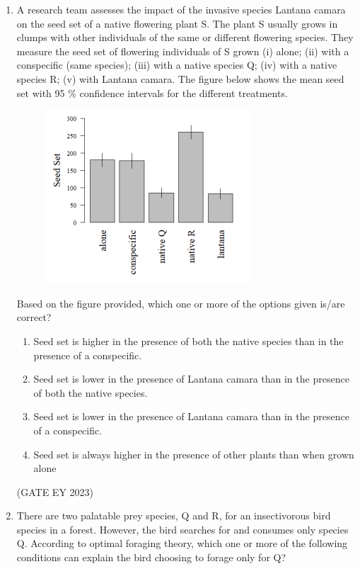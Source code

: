 \documentclass[journal,12pt,onecolumn]{IEEEtran}
\theoremstyle{remark}
\begin{document}
\begin{enumerate}
 \item A research team assesses the impact of the invasive species Lantana camara on the
seed set of a native flowering plant S. The plant S usually grows in clumps with
other individuals of the same or different flowering species. They measure the seed
set of flowering individuals of S grown (i) alone; (ii) with a conspecific (same
species); (iii) with a native species Q; (iv) with a native species R; (v) with
Lantana camara. The figure below shows the mean seed set with 95 \% confidence
intervals for the different treatments. 
\begin{figure}[H]
    \centering
    \includegraphics[]{figs/Q.50.png}
    \caption{}
    \label{fig:9}
\end{figure}

Based on the figure provided, which one or more of the options given is/are
correct?

\begin{enumerate}

\item Seed set is higher in the presence of both the native species than in the presence of
a conspecific.

\item Seed set is lower in the presence of Lantana camara than in the presence of both
the native species.
\item Seed set is lower in the presence of Lantana camara than in the presence of a
conspecific.
\item Seed set is always higher in the presence of other plants than when grown alone


\end{enumerate}
\hfill{(GATE EY 2023)}



 \item There are two palatable prey species, Q and R, for an insectivorous bird species in
a forest. However, the bird searches for and consumes only species Q. According
to optimal foraging theory, which one or more of the following conditions can
explain the bird choosing to forage only for Q?


\end{enumerate}
\end{document}
